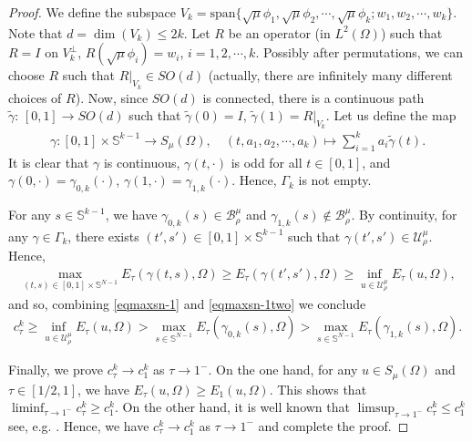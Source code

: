 \documentclass[10pt,a4paper]{article}
\theoremstyle{definition} \theoremstyle{remark}
\numberwithin{equation}{section}
\newcommand{\B}{\mathcal{B}}
\newcommand{\U}{\mathcal{U}}
\newcommand{\s}{\mathbb{S}}
\begin{document}
\begin{proof}
	We define the subspace $V_k=\text{span}\{\sqrt{\mu}\phi_1,\sqrt{\mu}\phi_2,\cdots, \sqrt{\mu}\phi_k;w_1, w_2,\cdots,w_k\}$. Note that $d = \dim(V_k) \leq 2k$. Let $R$ be an operator (in $L^2(\Omega)$) such that $R=I$ on $V_k^{\perp}$, $R(\sqrt{\mu}\phi_i)= w_i$, $i=1,2,\cdots ,k$. Possibly after permutations, we can choose $R$ such that $R\big |_{V_k}\in SO(d)$ (actually, there are infinitely many different choices of $R$). Now, since $SO(d)$ is connected, there is a continuous path $\tilde{\gamma}:\,[0,1]\rightarrow SO(d)$ such that $\tilde \gamma(0)=I$, $\tilde \gamma(1)=R\big |_{V_k}$. Let us define the map
	\begin{align*}
		\gamma: [0,1]\times \s^{k-1} \to S_\mu(\Omega), \quad (t,a_1,a_2,\cdots,a_k) \mapsto \sum_{i=1}^ka_i\tilde \gamma(t).
	\end{align*}
	It is clear that $\gamma$ is continuous, $\gamma(t,\cdot)$ is odd for all $t \in [0,1]$, and $\gamma(0,\cdot) = \gamma_{0,k}(\cdot)$, $\gamma(1,\cdot) = \gamma_{1,k}(\cdot)$. Hence, $\Gamma_k$ is not empty.
	
	For any $s \in \s^{k-1}$, we have $\gamma_{0,k}(s) \in \B^\mu_{\rho}$ and $\gamma_{1,k}(s) \notin \B^\mu_{\rho}$. By continuity, for any $\gamma \in \Gamma_k$, there exists $(t',s') \in [0,1]\times\s^{k-1}$ such that $\gamma(t',s') \in \U_{\rho}^\mu$. Hence,
	\begin{align*}
		\max_{(t,s) \in [0,1]\times\s^{N-1}}E_\tau(\gamma(t,s),\Omega) \geq E_\tau(\gamma(t',s'),\Omega) \geq \inf_{u \in \U_{\rho}^\mu}E_\tau(u,\Omega),
	\end{align*}
	and so, combining \eqref{eqmaxsn-1} and \eqref{eqmaxsn-1two} we conclude
	\begin{align*}
		c_\tau^k \geq \inf_{u \in \U_{\rho}^\mu}E_\tau(u,\Omega) > \max_{s \in \s^{N-1}}E_\tau(\gamma_{0,k}(s),\Omega) > \max_{s \in \s^{N-1}}E_\tau(\gamma_{1,k}(s),\Omega).
	\end{align*}
	
	Finally, we prove $c^k_\tau \to c^k_1$ as $\tau \to 1^-$. On the one hand, for any $u \in S_\mu(\Omega)$ and $\tau \in [1/2,1]$, we have $E_\tau(u,\Omega) \geq E_1(u,\Omega)$. This shows that $\liminf_{\tau \to 1^-}c^k_\tau \geq c^k_1$. On the other hand, it is well known that $\limsup_{\tau \to 1^-}c^k_\tau \leq c^k_1$ see, e.g. \cite{Louis}. Hence, we have $c^k_\tau \to c^k_1$ as $\tau \to 1^-$
	and complete the proof.
\end{proof}
\end{document}
